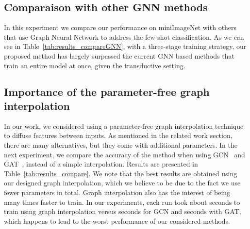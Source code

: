\documentclass[a4paper,conference]{IEEEtran}
\begin{document}
\subsection{Comparaison with other GNN methods}

In this experiment we compare our performance on miniImageNet with others that use Graph Neural Network to address the few-shot classification. As we can see in Table~\ref{tab:results_compareGNN}, with a three-stage training strategy, our proposed method has largely surpassed the current GNN based methods that train an entire model at once, given the transductive setting. 

\begin{table}
    \caption{1-shot and 5-shot performance (on miniImageNet) comparison with other GNN based methods. In our experiment we use the same hyperparameters as Table~\ref{tab:results}.}
    \centering

    \label{tab:results_compareGNN}
\end{table}

\subsection{Importance of the parameter-free graph interpolation}

In our work, we considered using a parameter-free graph interpolation technique to diffuse features between inputs. As mentioned in the related work section, there are many alternatives, but they come with additional parameters. In the next experiment, we compare the accuracy of the method when using GCN~\cite{kipf2016semi} and GAT~\cite{velivckovic2017graph}, instead of a simple interpolation. Results are presented in Table~\ref{tab:results_compare}. We note that the best results are obtained using our designed graph interpolation, which we believe to be due to the fact we use fewer parameters in total. Graph interpolation also has the interest of being many times faster to train. In our experiments, each run took about  seconds to train using graph interpolation versus  seconds for GCN and  seconds with GAT, which happens to lead to the worst performance of our considered methods.
\end{document}
